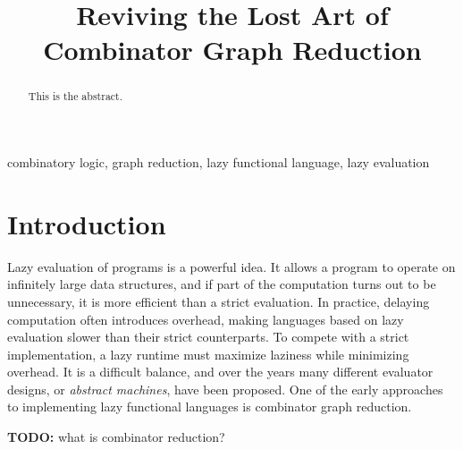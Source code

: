 \documentclass[conference]{IEEEtran}
\begin{document}
\title{Reviving the Lost Art of Combinator Graph Reduction}

\author{
}

\maketitle

\begin{abstract}
    This is the abstract.
\end{abstract}

\begin{IEEEkeywords}
    combinatory logic, graph reduction, lazy functional language, lazy evaluation
\end{IEEEkeywords}

\section{Introduction}
Lazy evaluation of programs is a powerful idea.
It allows a program to operate on infinitely large data structures, and if part of the computation turns out to be unnecessary, it is more efficient than a strict evaluation.
In practice, delaying computation often introduces overhead, making languages based on lazy evaluation slower than their strict counterparts.
To compete with a strict implementation, a lazy runtime must maximize laziness while minimizing overhead.
It is a difficult balance, and over the years many different evaluator designs, or \textit{abstract machines}, have been proposed\cite{kieburtz_g-machine_1985,fairbairn_tim_1987,burn_spineless_1988,koopman_fresh_1989,jones_implementing_nodate}.
One of the early approaches to implementing lazy functional languages is combinator graph reduction\cite{turner_new_1979}.

\textbf{TODO:} what is combinator reduction?
\end{document}
